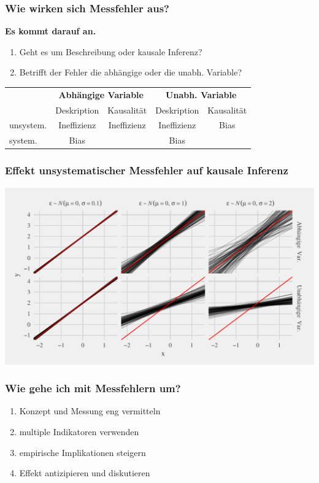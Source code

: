 \documentclass{beamer}\usepackage[]{graphicx}\usepackage[]{color}
\makeatletter
\def\maxwidth{ %
  \ifdim\Gin@nat@width>\linewidth
    \linewidth
  \else
    \Gin@nat@width
  \fi
}
\newenvironment{knitrout}{}{} %
\makeatother
\begin{document}
\begin{frame}
\frametitle{Wie wirken sich Messfehler aus?}
\textbf{Es kommt darauf an.}
\begin{enumerate}
  \item Geht es um Beschreibung oder kausale Inferenz?
  \item Betrifft der Fehler die abhängige oder die unabh. Variable?
\end{enumerate}
\vfill

\begin{tabular}{l*{4}{c}}
\toprule
~ & \multicolumn{2}{c}{\textbf{Abhängige Variable}} & \multicolumn{2}{c}{\textbf{Unabh. Variable}}\\
~ & Deskription & Kausalität & Deskription & Kausalität\\ \midrule
unsystem. & Ineffizienz & Ineffizienz & Ineffizienz & Bias \\
system. & Bias & ~ & Bias & ~\\
\bottomrule
\end{tabular}
\end{frame}

\begin{frame}
  \frametitle{Effekt unsystematischer Messfehler auf kausale Inferenz}
\begin{knitrout}
\color{fgcolor}
\includegraphics[width=\maxwidth]{figure/execute-error-simulation-1} 

\end{knitrout}
\end{frame}

\begin{frame}
  \frametitle{Wie gehe ich mit Messfehlern um?}
  \begin{enumerate}
    \item Konzept und Messung eng vermitteln
    \item multiple Indikatoren verwenden
    \item empirische Implikationen steigern
    \item Effekt antizipieren und diskutieren
  \end{enumerate}
\end{frame}
\end{document}
